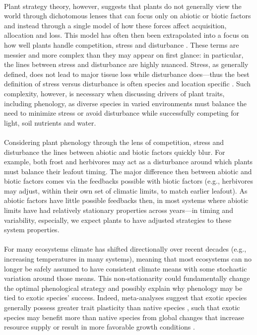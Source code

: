 \documentclass[11pt,a4paper,oneside]{article}
\begin{document}
\\
Plant strategy theory, however, suggests that plants do not generally view the world through dichotomous lenses that can focus only on abiotic or biotic factors and instead through a single model of how these forces affect acquisition, allocation and loss. This model has often then been extrapolated into a focus on how well plants handle competition, stress and disturbance \citep{Grime:1977sw,crainebook}. These terms are messier and more complex than they may appear on first glance: in particular, the lines between stress and disturbance are highly nuanced. Stress, as generally defined, does not lead to major tissue loss while disturbance does---thus the best definition of stress versus disturbance is often species and location specific \citep{crainebook}. Such complexity, however, is necessary when discussing drivers of plant traits, including phenology, as diverse species in varied environments must balance the need to minimize stress or avoid disturbance while successfully competing for light, soil nutrients and water.\\ %
\\ 
Considering plant phenology through the lens of competition, stress and disturbance the lines between abiotic and biotic factors quickly blur. For example, both frost and herbivores may act as a disturbance around which plants must balance their leafout timing. The major difference then between abiotic and biotic factors comes via the feedbacks possible with biotic factors (e.g., herbivores may adjust, within their own set of climatic limits, to match earlier leafout). As abiotic factors have little possible feedbacks then, in most systems where abiotic limits have had relatively stationary properties across years---in timing and variability, especially, we expect plants to have adjusted strategies to these system properties.\\
\\
For many ecosystems climate has shifted directionally over recent decades (e.g., increasing temperatures in many systems), meaning that most ecosystems can no longer be safely assumed to have consistent climate means with some stochastic variation around those means. This non-stationarity could fundamentally change the optimal phenological strategy and possibly explain why phenology may be tied to exotic species' success. Indeed, meta-analyses suggest that exotic species generally possess greater trait plasticity than native species \citep{Davidson2011}, such that exotic species may benefit more than native species from global changes that increase resource supply or result in more favorable growth conditions \citep{Richards:2006si}.\\
\end{document}

